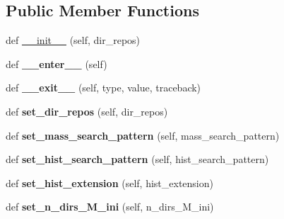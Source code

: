 \subsection*{Public Member Functions}
\begin{DoxyCompactItemize}
\item 
def \hyperlink{classasamba_1_1var__def_1_1tracks_a317ae0c8a333fcbcf9e907f9f09d4c48}{\+\_\+\+\_\+init\+\_\+\+\_\+} (self, dir\+\_\+repos)
\item 
\mbox{\label{classasamba_1_1var__def_1_1tracks_a3fa0854d4982624b4a2f954c745e9f6d}} 
def {\bfseries \+\_\+\+\_\+enter\+\_\+\+\_\+} (self)
\item 
\mbox{\label{classasamba_1_1var__def_1_1tracks_a2f766da66983a7e055916b8a2c6d8c8b}} 
def {\bfseries \+\_\+\+\_\+exit\+\_\+\+\_\+} (self, type, value, traceback)
\item 
\mbox{\label{classasamba_1_1var__def_1_1tracks_acbfad91a58aad6c1d94d4697c5da07f2}} 
def {\bfseries set\+\_\+dir\+\_\+repos} (self, dir\+\_\+repos)
\item 
\mbox{\label{classasamba_1_1var__def_1_1tracks_a3a604a91219aee4ceefe39ec53a11909}} 
def {\bfseries set\+\_\+mass\+\_\+search\+\_\+pattern} (self, mass\+\_\+search\+\_\+pattern)
\item 
\mbox{\label{classasamba_1_1var__def_1_1tracks_ade5767a5bf3585e28b799c9f0293cc47}} 
def {\bfseries set\+\_\+hist\+\_\+search\+\_\+pattern} (self, hist\+\_\+search\+\_\+pattern)
\item 
\mbox{\label{classasamba_1_1var__def_1_1tracks_a9915164166bfc2053982747a020ba9e7}} 
def {\bfseries set\+\_\+hist\+\_\+extension} (self, hist\+\_\+extension)
\item 
\mbox{\label{classasamba_1_1var__def_1_1tracks_aaa05dae334bf401bb6a5a68c3bdd44aa}} 
def {\bfseries set\+\_\+n\+\_\+dirs\+\_\+\+M\+\_\+ini} (self, n\+\_\+dirs\+\_\+\+M\+\_\+ini)
\item 
\mbox{\label{classasamba_1_1var__def_1_1tracks_ab4111e6b26edf9e76ceb96bec4763064}} 

\end{DoxyCompactItemize}
